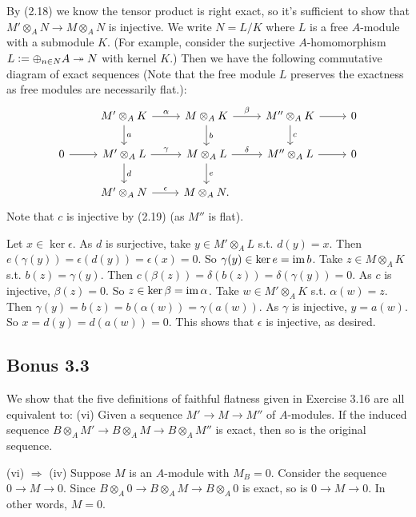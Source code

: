 \documentclass[../A&M.tex]{subfiles}
\begin{document}
By (2.18) we know the tensor product is right exact, so it's sufficient to show that $M' \otimes_A N \to M \otimes_A N$ is injective. We write $N=L/K$ where $L$ is a free $A$-module with a submodule $K$. (For example, consider the surjective $A$-homomorphism $L := \oplus_{n\in N} A \twoheadrightarrow N$ with kernel $K$.) Then we have the following commutative diagram of exact sequences (Note that the free module $L$ preserves the exactness as free modules are necessarily flat.):
$$
\begin{tikzcd}
	& M' \otimes_A K \arrow[r, "\alpha"] \arrow[d, "a"] & M \otimes_A K \arrow[r, "\beta"] \arrow[d, "b"] & M'' \otimes_A K \arrow{r} \arrow[d, "c"] & 0 \\ 
0 \arrow{r} & M' \otimes_A L \arrow[r, "\gamma"] \arrow[d, "d"] & M \otimes_A L \arrow[r, "\delta"] \arrow[d, "e"] & M'' \otimes_A L \arrow[r] & 0 \\
	& M' \otimes_A N \arrow[r, "\epsilon"] & M \otimes_A N. & &
\end{tikzcd}
$$
Note that $c$ is injective by (2.19) (as $M''$ is flat).

Let $x \in \ker \epsilon$. As $d$ is surjective, take $y \in M' \otimes_A L$ s.t. $d(y)=x$. Then $e(\gamma(y)) = \epsilon(d(y)) = \epsilon(x) = 0$. So $\gamma(y) \in \ker e = \operatorname{im} b$. Take $z \in M \otimes_A K$ s.t. $b(z)=\gamma(y)$. Then $c(\beta(z)) = \delta(b(z)) = \delta(\gamma(y)) = 0$. As $c$ is injective, $\beta(z)=0$. So $z\in \ker \beta = \operatorname{im} \alpha$. Take $w\in M' \otimes_A K$ s.t. $\alpha(w) = z$. Then $\gamma(y) = b(z) = b(\alpha(w)) = \gamma(a(w))$. As $\gamma$ is injective, $y=a(w)$. So $x = d(y) = d(a(w)) = 0$. This shows that $\epsilon$ is injective, as desired.

\subsection*{Bonus 3.3} \label{Bonus 3.3}

We show that the five definitions of faithful flatness given in Exercise 3.16 are all equivalent to: (vi) Given a sequence $M' \to M \to M''$ of $A$-modules. If the induced sequence $B \otimes_A M' \to B \otimes_A M \to B \otimes_A M''$ is exact, then so is the original sequence.

(vi) $\Rightarrow$ (iv) Suppose $M$ is an $A$-module with $M_B = 0$. Consider the sequence $0 \to M \to 0$. Since $B \otimes_A 0 \to B \otimes_A M \to B \otimes_A 0$ is exact, so is $0 \to M \to 0$. In other words, $M=0$.
\end{document}
